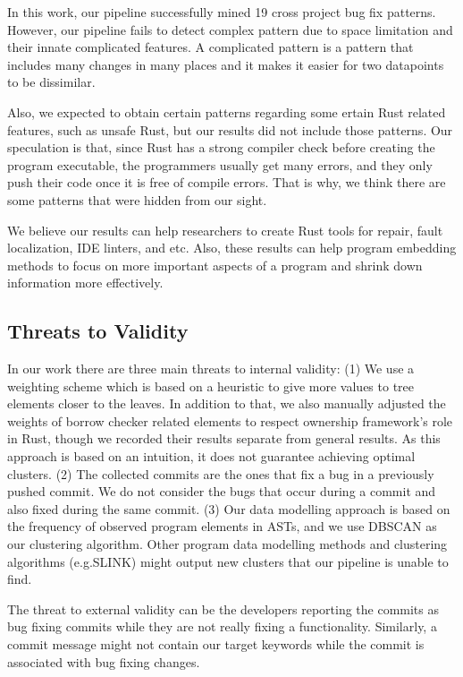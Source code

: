 In this work, our pipeline successfully mined 19 cross project bug fix patterns. However, our pipeline fails to detect complex pattern due to space limitation and their innate complicated features. A complicated pattern is a pattern that includes many changes in many places and it makes it easier for two datapoints to be dissimilar. 

Also, we expected to obtain certain patterns regarding some ertain Rust related features, such as unsafe Rust, but our results did not include those patterns. Our speculation is that, since Rust has a strong compiler check before creating the program executable, the programmers usually get many errors, and they only push their code once it is free of compile errors. That is why, we think there are some patterns that were hidden from our sight.

We believe our results can help researchers to create Rust tools for repair, fault localization, IDE linters, and etc. Also, these results can help program embedding methods to focus on more important aspects of a program and shrink down information more effectively.

\subsection{Threats to Validity}

In our work there are three main threats to internal validity: (1) We use a weighting scheme which is based on a heuristic to give more values to tree elements closer to the leaves. In addition to that, we also manually adjusted the weights of borrow checker related elements to respect ownership framework's role in Rust, though we recorded their results separate from general results. As this approach is based on an intuition, it does not guarantee achieving optimal clusters. (2) The collected commits are the ones that fix a bug in a previously pushed commit. We do not consider the bugs that occur during a commit and also fixed during the same commit. (3) Our data modelling approach is based on the frequency of observed program elements in ASTs, and we use DBSCAN as our clustering algorithm. Other program data modelling methods and clustering algorithms (e.g.SLINK) might output new clusters that our pipeline is unable to find. 

The threat to external validity can be the developers reporting the commits as bug fixing commits while they are not really fixing a functionality. Similarly, a commit message might not contain our target keywords while the commit is associated with bug fixing changes.
